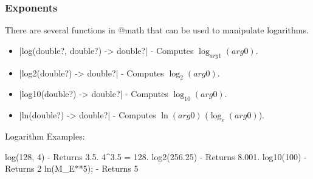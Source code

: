 \documentclass[12pt, letterpaper, oneside]{article}
\begin{document}
	\subsubsection{Exponents}
	There are several functions in @math that can be used to manipulate \newline logarithms.
		\begin{itemize}
			\item[--] \spverb|log(double?, double?) -> double?| - Computes $\log_{arg1}(arg0)$.
			\item[--] \spverb|log2(double?) -> double?| - Computes $\log_{2}(arg0)$.
			\item[--] \spverb|log10(double?) -> double?| - Computes $\log_{10}(arg0)$.
			\item[--] \spverb|ln(double?) -> double?| - Computes $\ln(arg0)$ ($\log_{e}(arg0)$).
		\end{itemize}
		Logarithm Examples:
		\begin{spverbatim}
			log(128, 4) - Returns 3.5. 4^3.5 = 128.
			log2(256.25) - Returns 8.001.
			log10(100) - Returns 2
			ln(M_E**5); - Returns 5 
		\end{spverbatim}
		\newpage
\end{document}
